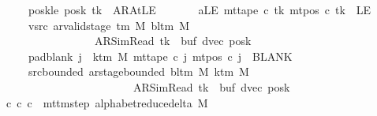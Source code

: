 \begin{isabellebody}
\ \ \ \ \ \ \ posk{\isacharunderscore}{\kern0pt}le{\isacharcolon}{\kern0pt}\ {\isachardoublequoteopen}posk\ tk\ {\isacharequal}{\kern0pt}\ AR{\isacharunderscore}{\kern0pt}AtLE{\isachardoublequoteclose}\isanewline
\ \ \ \ \ \ \ aLE{\isacharcolon}{\kern0pt}\ {\isachardoublequoteopen}mt{\isacharunderscore}{\kern0pt}tape\ c{\isacharprime}{\kern0pt}\ tk\ {\isacharparenleft}{\kern0pt}mt{\isacharunderscore}{\kern0pt}pos\ c{\isacharprime}{\kern0pt}\ tk{\isacharparenright}{\kern0pt}\ {\isacharequal}{\kern0pt}\ LE{}{\isachardoublequoteclose}\isanewline
\ \ \ \ \ \ \ vsrc{\isacharcolon}{\kern0pt}\ {\isachardoublequoteopen}ar{\isacharunderscore}{\kern0pt}valid{\isacharunderscore}{\kern0pt}stage\ {\isacharparenleft}{\kern0pt}{\isasymGamma}{\isacharunderscore}{\kern0pt}tm\ M{\isacharparenright}{\kern0pt}\ {\isacharparenleft}{\kern0pt}bl{\isacharunderscore}{\kern0pt}tm\ M{\isacharparenright}{\kern0pt}\isanewline
\ \ \ \ \ \ \ \ \ \ \ \ \ \ \ \ \ \ \ {\isacharparenleft}{\kern0pt}AR{\isacharunderscore}{\kern0pt}SimRead{\isacharcomma}{\kern0pt}\ tk{\isacharcomma}{\kern0pt}\ {}{\isacharcomma}{\kern0pt}\ buf{\isacharcomma}{\kern0pt}\ dvec{\isacharcomma}{\kern0pt}\ posk{\isacharparenright}{\kern0pt}{\isachardoublequoteclose}\isanewline
\ \ \ \ \ \ \ pad{\isacharunderscore}{\kern0pt}blank{\isacharcolon}{\kern0pt}\ {\isachardoublequoteopen}{\isasymforall}j\ {\isasymge}\ k{\isacharunderscore}{\kern0pt}tm\ M{\isachardot}{\kern0pt}\ mt{\isacharunderscore}{\kern0pt}tape\ c{\isacharprime}{\kern0pt}\ j\ {\isacharparenleft}{\kern0pt}mt{\isacharunderscore}{\kern0pt}pos\ c{\isacharprime}{\kern0pt}\ j{\isacharparenright}{\kern0pt}\ {\isacharequal}{\kern0pt}\ BLANK{}{\isachardoublequoteclose}\isanewline
\ \ \ \ \ \ \ src{\isacharunderscore}{\kern0pt}bounded{\isacharcolon}{\kern0pt}\ {\isachardoublequoteopen}ar{\isacharunderscore}{\kern0pt}stage{\isacharunderscore}{\kern0pt}bounded\ {\isacharparenleft}{\kern0pt}bl{\isacharunderscore}{\kern0pt}tm\ M{\isacharparenright}{\kern0pt}\ {\isacharparenleft}{\kern0pt}k{\isacharunderscore}{\kern0pt}tm\ M{\isacharparenright}{\kern0pt}\isanewline
\ \ \ \ \ \ \ \ \ \ \ \ \ \ \ \ \ \ \ \ \ \ \ \ \ \ {\isacharparenleft}{\kern0pt}AR{\isacharunderscore}{\kern0pt}SimRead{\isacharcomma}{\kern0pt}\ tk{\isacharcomma}{\kern0pt}\ {}{\isacharcomma}{\kern0pt}\ buf{\isacharcomma}{\kern0pt}\ dvec{\isacharcomma}{\kern0pt}\ posk{\isacharparenright}{\kern0pt}{\isachardoublequoteclose}\isanewline
\ \ \ {\isachardoublequoteopen}{\isasymexists}c{\isacharprime}{\kern0pt}{\isacharprime}{\kern0pt}{\isachardot}{\kern0pt}\ {\isacharparenleft}{\kern0pt}c{\isacharprime}{\kern0pt}{\isacharcomma}{\kern0pt}\ c{\isacharprime}{\kern0pt}{\isacharprime}{\kern0pt}{\isacharparenright}{\kern0pt}\ {\isasymin}\ mttm{\isacharunderscore}{\kern0pt}step\ {\isacharparenleft}{\kern0pt}alphabet{\isacharunderscore}{\kern0pt}reduce{\isacharunderscore}{\kern0pt}delta\ M{\isacharparenright}{\kern0pt}\isanewline

\end{isabellebody}
